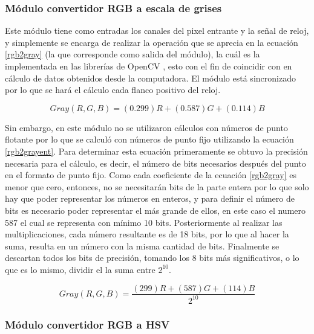 \documentclass[twoside,spanish,ESP,MSc]{plantillaLabUPV}
\theoremstyle{definition}
\begin{document}
\subsubsection{Módulo convertidor RGB a escala de grises}
Este módulo tiene como entradas los canales del pixel entrante y la señal de reloj, y simplemente se encarga de realizar la operación que se aprecia en la ecuación \ref{rgb2gray} (la que corresponde como salida del módulo), la cuál es la implementada en las librerías de OpenCV \cite{ocvbook}%
 , esto con el fin de coincidir con en cálculo de datos obtenidos desde la computadora. El módulo está sincronizado por lo que se hará el cálculo cada flanco positivo del reloj.

\begin{equation} \label{rgb2gray}
Gray(R,G,B) = (0.299)R + (0.587)G + (0.114)B
\end{equation}

Sin embargo, en este módulo no se utilizaron cálculos con números de punto flotante por lo que se calculó con números de punto fijo utilizando la ecuación \ref{rgb2grayent}. Para determinar esta ecuación primeramente se obtuvo la precisión necesaria para el cálculo, es decir, el número de bits necesarios después del punto en el formato de punto fijo. Como cada coeficiente de la ecuación \ref{rgb2gray} es menor que cero, entonces, no se necesitarán bits de la parte entera por lo que solo hay que poder representar los números en enteros, y para definir el número de bits es necesario poder representar el más grande de ellos, en este caso el numero 587 el cual se representa con mínimo 10 bits. Posteriormente al realizar las multiplicaciones, cada número resultante es de 18 bits, por lo que al hacer la suma, resulta en un número con la misma cantidad de bits. Finalmente se descartan todos los bits de precisión, tomando los 8 bits más significativos, o lo que es lo mismo, dividir el la suma entre $2^{10}$.

\begin{equation} \label{rgb2grayent}
Gray(R,G,B) = \frac{ (299)R + (587)G + (114)B} {2^{10}}
\end{equation}

\subsubsection{Módulo convertidor RGB a HSV}
\end{document}
